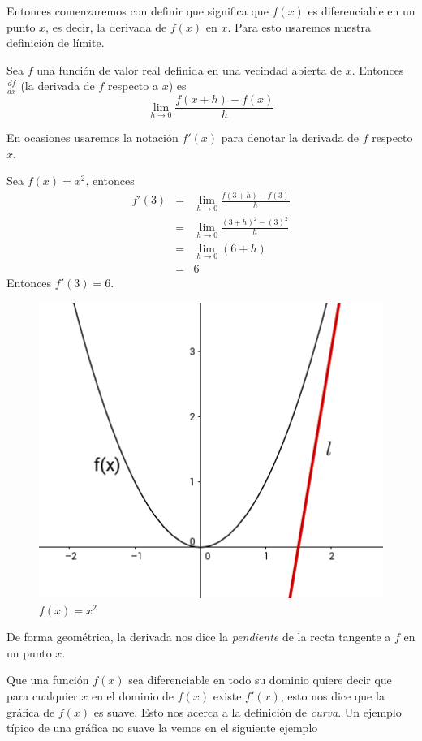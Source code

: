 Entonces comenzaremos con definir que significa que $f(x)$ es diferenciable en un punto $x$, es decir, la derivada de $f(x)$ en $x$. Para esto usaremos
nuestra definición de límite.

\begin{definition}
    Sea $f$ una función de valor real definida en una vecindad abierta de $x$. Entonces $\frac{df}{dx}$ (la derivada de $f$ respecto a $x$) es
    $$ \lim_{h \rightarrow 0} \frac{f(x+h) - f(x)}{h} $$
\end{definition}

En ocasiones usaremos la notación $f'(x)$ para denotar la derivada de $f$ respecto $x$.

\begin{example}
    Sea $f(x)=x^{2}$, entonces
    \begin{eqnarray*}
        f'(3) &=& \lim_{h \rightarrow 0} \frac{f(3+h)-f(3)}{h} \\
              &=& \lim_{h \rightarrow 0} \frac{(3+h)^{2}-(3)^{2}}{h} \\
              &=& \lim_{h \rightarrow 0} (6 + h) \\
              &=& 6
    \end{eqnarray*}
    Entonces $f'(3) = 6$.
\end{example}

\begin{figure}[!ht]
  \begin{center}
      \includegraphics[width=0.6\linewidth]{gfx/derivative-example}
      \caption{$f(x)=x^{2}$}
      \label{fig:boat1}
  \end{center}
\end{figure}

De forma geométrica, la derivada nos dice la \emph{pendiente} de la recta tangente a $f$ en un punto $x$.

Que una función $f(x)$ sea diferenciable en todo su dominio quiere decir que para cualquier $x$ en el dominio de $f(x)$ existe
$f'(x)$, esto nos dice que la gráfica de $f(x)$ es suave. Esto nos acerca a la definición de \emph{curva}. Un ejemplo típico 
de una gráfica no suave la vemos en el siguiente ejemplo

